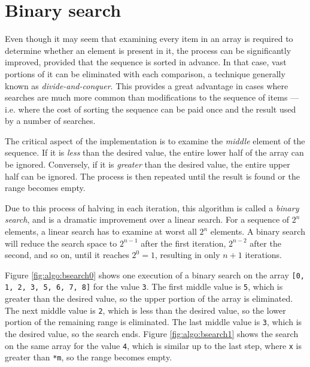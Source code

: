 \section{Binary search}
\label{sec:algo:bsearch}

Even though it may seem that examining every item in an array is required to
determine whether an element is present in it, the process can be significantly
improved, provided that the sequence is sorted in advance.  In that case, vast
portions of it can be eliminated with each comparison, a technique generally
known as \textit{divide-and-conquer}.  This provides a great advantage in cases
where searches are much more common than modifications to the sequence of items
--- i.e. where the cost of sorting the sequence can be paid once and the result
used by a number of searches.

The critical aspect of the implementation is to examine the \emph{middle}
element of the sequence.  If it is \emph{less} than the desired value, the
entire lower half of the array can be ignored.  Conversely, if it is
\emph{greater} than the desired value, the entire upper half can be ignored.
The process is then repeated until the result is found or the range becomes
empty.

Due to this process of halving in each iteration, this algorithm is called a
\textit{binary search}, and is a dramatic improvement over a linear search.  For
a sequence of $2^n$ elements, a linear search has to examine at worst all $2^n$
elements.  A binary search will reduce the search space to $2^{n-1}$ after the
first iteration, $2^{n-2}$ after the second, and so on, until it reaches $2^0 =
1$, resulting in only $n+1$ iterations\footnotemark.


Figure \ref{fig:algo:bsearch0} shows one execution of a binary search on the
array \texttt{[0, 1, 2, 3, 5, 6, 7, 8]} for the value \texttt{3}.  The first
middle value is \texttt{5}, which is greater than the desired value, so the
upper portion of the array is eliminated.  The next middle value is \texttt{2},
which is less than the desired value, so the lower portion of the remaining
range is eliminated.  The last middle value is \texttt{3}, which is the desired
value, so the search ends.  Figure \ref{fig:algo:bsearch1} shows the search on
the same array for the value \texttt{4}, which is similar up to the last step,
where \texttt{x} is greater than \texttt{*m}, so the range becomes empty.

